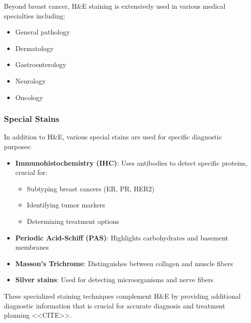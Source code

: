 Beyond breast cancer, H\&E staining is extensively used in various
medical specialties including:
\begin{itemize}
  \item General pathology
  \item Dermatology
  \item Gastroenterology
  \item Neurology
  \item Oncology
\end{itemize}

\subsubsection{Special Stains}

In addition to H\&E, various special stains are used for specific
diagnostic purposes:

\begin{itemize}
  \item \textbf{Immunohistochemistry (IHC)}: Uses antibodies to
    detect specific proteins, crucial for:
    \begin{itemize}
      \item Subtyping breast cancers (ER, PR, HER2)
      \item Identifying tumor markers
      \item Determining treatment options
    \end{itemize}
  \item \textbf{Periodic Acid-Schiff (PAS)}: Highlights carbohydrates
    and basement membranes
  \item \textbf{Masson's Trichrome}: Distinguishes between collagen
    and muscle fibers
  \item \textbf{Silver stains}: Used for detecting microorganisms and
    nerve fibers
\end{itemize}

These specialized staining techniques complement H\&E by providing
additional diagnostic information that is crucial for accurate
diagnosis and treatment planning <<CITE>>.
